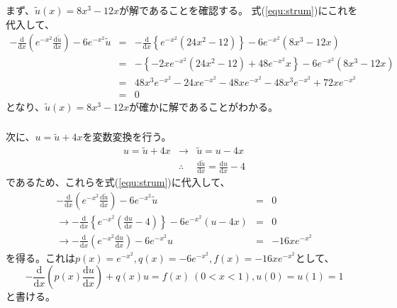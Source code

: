 \documentclass[a4j, titlepage]{jsarticle}
\numberwithin{equation}{section}
\begin{document}
        \subsubsection{}
            まず、$\tilde{u}(x)=8x^3-12x$が解であることを確認する。
            式(\ref{equ:strum})にこれを代入して、
            \begin{eqnarray*}
                -\frac{\mathrm{d}}{\mathrm{d}x}\left(e^{-x^2}\frac{\mathrm{d}\tilde{u}}{\mathrm{d}x}\right)-6e^{-x^2}\tilde{u} &=& -\frac{\mathrm{d}}{\mathrm{d}x}\left\{e^{-x^2}(24x^2-12)\right\}-6e^{-x^2}(8x^3-12x) \\
                &=& -\left\{-2xe^{-x^2}(24x^2-12) + 48e^{-x^2}x\right\}-6e^{-x^2}(8x^3-12x) \\
                &=& 48x^3e^{-x^2} - 24xe^{-x^2} - 48xe^{-x^2} -48x^3e^{-x^2} + 72xe^{-x^2} \\
                &=& 0
            \end{eqnarray*}
            となり、$\tilde{u}(x)=8x^3-12x$が確かに解であることがわかる。

        \subsubsection{}
            次に、$u=\tilde{u} + 4x$を変数変換を行う。
            \begin{eqnarray*}
                u=\tilde{u} + 4x &\rightarrow& \tilde{u} = u - 4x \\
                &\therefore& \frac{\mathrm{d}\tilde{u}}{\mathrm{d}x} = \frac{\mathrm{d}u}{\mathrm{d}x}-4
            \end{eqnarray*}
            であるため、これらを式(\ref{equ:strum})に代入して、
            \begin{eqnarray*}
                -\frac{\mathrm{d}}{\mathrm{d}x}\left(e^{-x^2}\frac{\mathrm{d}\tilde{u}}{\mathrm{d}x}\right)-6e^{-x^2}\tilde{u} &=& 0 \\
                \rightarrow -\frac{\mathrm{d}}{\mathrm{d}x}\left\{e^{-x^2}\left(\frac{\mathrm{d}u}{\mathrm{d}x}-4\right)\right\}-6e^{-x^2}(u - 4x) &=& 0 \\
                \rightarrow -\frac{\mathrm{d}}{\mathrm{d}x}\left(e^{-x^2}\frac{\mathrm{d}u}{\mathrm{d}x}\right)-6e^{-x^2}u &=& -16xe^{-x^2}
            \end{eqnarray*}
            を得る。これは$p(x)=e^{-x^2}, q(x)=-6e^{-x^2}, f(x)=-16xe^{-x^2}$として、
            \begin{equation*}
                -\frac{\mathrm{d}}{\mathrm{d}x}\left(p(x)\frac{\mathrm{d}u}{\mathrm{d}x}\right)+q(x)u = f(x) \ (0<x<1), u(0)=u(1)=1
            \end{equation*}
            と書ける。
\end{document}
